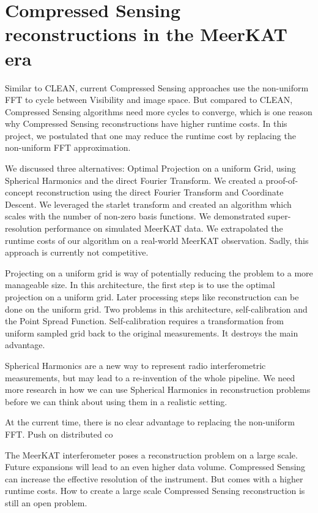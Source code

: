 \section{Compressed Sensing reconstructions in the MeerKAT era}
Similar to CLEAN, current Compressed Sensing approaches use the non-uniform FFT to cycle between Visibility and image space. But compared to CLEAN, Compressed Sensing algorithms need more cycles to converge, which is one reason why Compressed Sensing reconstructions have higher runtime costs. In this project, we postulated that one may reduce the runtime cost by replacing the non-uniform FFT approximation. 

We discussed three alternatives: Optimal Projection on a uniform Grid, using Spherical Harmonics and the direct Fourier Transform. We created a proof-of-concept reconstruction using the direct Fourier Transform and Coordinate Descent. We leveraged the starlet transform and created an algorithm which scales with the number of non-zero basis functions. We demonstrated super-resolution performance on simulated MeerKAT data. We extrapolated the runtime costs of our algorithm on a real-world MeerKAT observation. Sadly, this approach is currently not competitive.

Projecting on a uniform grid is way of potentially reducing the problem to a more manageable size. In this architecture, the first step is to use the optimal projection on a uniform grid. Later processing steps like reconstruction can be done on the uniform grid. Two problems in this architecture, self-calibration and the Point Spread Function. Self-calibration requires a transformation from uniform sampled grid back to the original measurements. It destroys the main advantage.

Spherical Harmonics are a new way to represent radio interferometric measurements, but may lead to a re-invention of the whole pipeline. We need more research in how we can use Spherical Harmonics in reconstruction problems before we can think about using them in a realistic setting.

At the current time, there is no clear advantage to replacing the non-uniform FFT.
Push on distributed co




The MeerKAT interferometer poses a reconstruction problem on a large scale. Future expansions will lead to an even higher data volume. Compressed Sensing can increase the effective resolution of the instrument. But comes with a higher runtime costs. How to create a large scale Compressed Sensing reconstruction is still an open problem.



